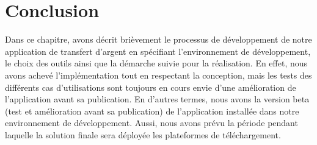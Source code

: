 \chapter*{Conclusion}
Dans ce chapitre, avons décrit brièvement le processus de développement de notre application
de transfert d'argent en spécifiant l’environnement de développement, le choix des
outils ainsi que la démarche suivie pour la réalisation.
En effet, nous avons achevé l’implémentation tout en respectant la conception, mais les tests
des différents cas d’utilisations sont toujours en cours envie d’une amélioration de l’application
avant sa publication.
En d’autres termes, nous avons la version beta (test et amélioration avant sa publication) de
l’application installée dans notre environnement de développement. Aussi, nous avons prévu la
période pendant laquelle la solution finale sera déployée les plateformes de téléchargement.
